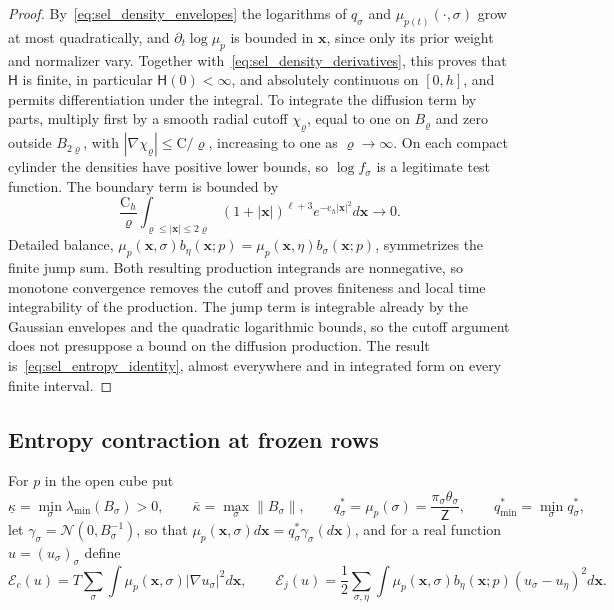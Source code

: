 \begin{proof}
By~\eqref{eq:sel_density_envelopes} the logarithms of $q_\sigma$ and $\mu_{p(t)}(\cdot,\sigma)$ grow at most quadratically, and $\partial_t\log\mu_p$ is bounded in $\mathbf x$, since only its prior weight and normalizer vary. Together with~\eqref{eq:sel_density_derivatives}, this proves that $\mathsf H$ is finite, in particular $\mathsf H(0)<\infty$, and absolutely continuous on $[0,h]$, and permits differentiation under the integral. To integrate the diffusion term by parts, multiply first by a smooth radial cutoff $\chi_\varrho$, equal to one on $B_\varrho$ and zero outside $B_{2\varrho}$, with $|\nabla\chi_\varrho|\le\mathrm C/\varrho$, increasing to one as $\varrho\to\infty$. On each compact cylinder the densities have positive lower bounds, so $\log f_\sigma$ is a legitimate test function. The boundary term is bounded by
\[
\frac{\mathrm C_h}\varrho\int_{\varrho\le|\mathbf x|\le2\varrho}(1+|\mathbf x|)^{\ell+3}e^{-\mathrm c_h|\mathbf x|^2}d\mathbf x\longrightarrow0.
\]
Detailed balance, $\mu_p(\mathbf x,\sigma)b_\eta(\mathbf x;p)=\mu_p(\mathbf x,\eta)b_\sigma(\mathbf x;p)$, symmetrizes the finite jump sum. Both resulting production integrands are nonnegative, so monotone convergence removes the cutoff and proves finiteness and local time integrability of the production. The jump term is integrable already by the Gaussian envelopes and the quadratic logarithmic bounds, so the cutoff argument does not presuppose a bound on the diffusion production. The result is~\eqref{eq:sel_entropy_identity}, almost everywhere and in integrated form on every finite interval.
\end{proof}

\subsection{Entropy contraction at frozen rows}\label{app:sel_lsi}

For $p$ in the open cube put
\[
\underline\kappa=\min_\sigma\lambda_{\min}(B_\sigma)>0,\qquad
\bar\kappa=\max_\sigma\|B_\sigma\|,\qquad
q^*_\sigma=\mu_p(\sigma)=\frac{\pi_\sigma\theta_\sigma}{\mathsf Z},\qquad
q^*_{\min}=\min_\sigma q^*_\sigma,
\]
let $\gamma_\sigma=\mathcal N(0,B_\sigma^{-1})$, so that $\mu_p(\mathbf x,\sigma)d\mathbf x=q^*_\sigma\gamma_\sigma(d\mathbf x)$, and for a real function $u=(u_\sigma)_\sigma$ define
\[
\mathcal E_c(u)=T\sum_\sigma\int\mu_p(\mathbf x,\sigma)|\nabla u_\sigma|^2d\mathbf x,\qquad
\mathcal E_j(u)=\frac12\sum_{\sigma,\eta}\int\mu_p(\mathbf x,\sigma)b_\eta(\mathbf x;p)(u_\sigma-u_\eta)^2d\mathbf x.
\]


